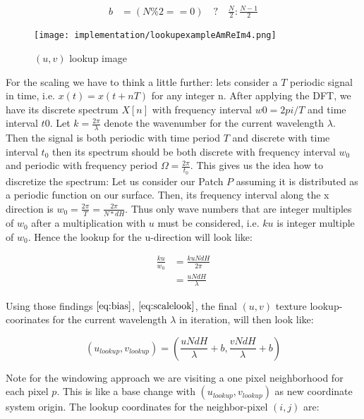 \begin{align}
    b
    &= (N \% 2 == 0) \quad ? \quad \frac{N}{2} : \frac{N-1}{2}
\label{eq:bias}
\end{align}

\begin{figure}[H]
  \centering
  \texttt{[image: implementation/lookupexampleAmReIm4.png]}
  \caption[Lookup in DFT Terms]{$(u,v)$ lookup image}
\label{fig:lookupexample}
\end{figure}

For the scaling we have to think a little further: lets consider a $T$ periodic signal in time, i.e. $x(t) = x(t+nT)$ for any integer n. After applying the DFT, we have its discrete spectrum $X[n]$ with frequency interval $w0 = 2pi / T$ and time interval $t0$. Let $k = \frac{2 \pi}{\lambda}$ denote the wavenumber for the current wavelength $\lambda$.
Then the signal is both periodic with time period $T$ and discrete with time interval $t_0$ then its spectrum should be both discrete with frequency interval $w_0$ and periodic with frequency period $\Omega = \frac{2 \pi}{t_0}$. This gives us the idea how to discretize the spectrum: Let us consider our Patch $P$ assuming it is distributed as a periodic function on our surface. Then, its frequency interval along the x direction is $w_0 = \frac{2 \pi}{T} = \frac{2 \pi}{N*dH}$. 
Thus only wave numbers that are integer multiples of $w_0$ after a multiplication with $u$ must be considered, i.e. $ku$ is integer multiple of $w_0$. Hence the lookup for the u-direction will look like:

\begin{align}
    \frac{ku}{w_0} 
    &= \frac{ku N dH}{2 \pi} \\
    &= \frac{u N dH}{\lambda}
\label{eq:scalelook}
\end{align}

Using those findings $\ref{eq:bias}$, $\ref{eq:scalelook}$, the final $(u,v)$ texture lookup-coorinates for the current wavelength $\lambda$ in iteration, will then look like:

\begin{equation}
  (u_{lookup}, v_{lookup}) = \left( \frac{u N dH}{\lambda} + b, \frac{v N dH}{\lambda} + b \right)
\label{eq:ublookup}
\end{equation}  

Note for the windowing approach we are visiting a one pixel neighborhood for each pixel $p$. 
This is like a base change with $(u_{lookup}, v_{lookup})$ as new coordinate system origin. The lookup coordinates for the neighbor-pixel $(i,j)$ are:

